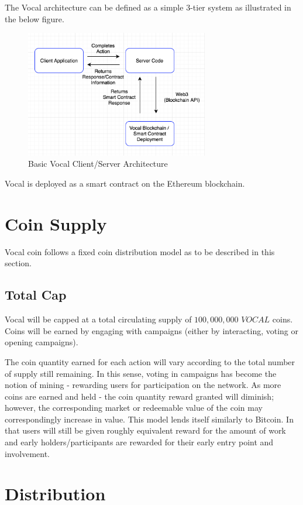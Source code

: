 \documentclass[conference]{IEEEtran}
\begin{document}
    The Vocal architecture can be defined as a simple 3-tier system as illustrated in the below figure.

    \begin{figure}[t]
      \includegraphics[width=8cm]{assets/architecture.png}
      \caption{Basic Vocal Client/Server Architecture}
      \centering
    \end{figure}

     Vocal is deployed as a smart contract on the Ethereum blockchain.

    \section{Coin Supply}

   Vocal coin follows a fixed coin distribution model as to be described in this section.

    \subsection{Total Cap}
   Vocal will be capped at a total circulating supply of $100,000,000$ $VOCAL$ coins. Coins will be earned by engaging with campaigns (either by interacting, voting or opening campaigns).

     The coin quantity earned for each action will vary according to the total number of supply still remaining. In this sense, voting in campaigns has become the notion of mining - rewarding users for participation on the network. As more coins are earned and held - the coin quantity reward granted will diminish; however, the corresponding market or redeemable value of the coin may correspondingly increase in value. This model lends itself similarly to Bitcoin. In that users will still be given roughly equivalent reward for the amount of work and early holders/participants are rewarded for their early entry point and involvement.

    \section{Distribution}
\end{document}
